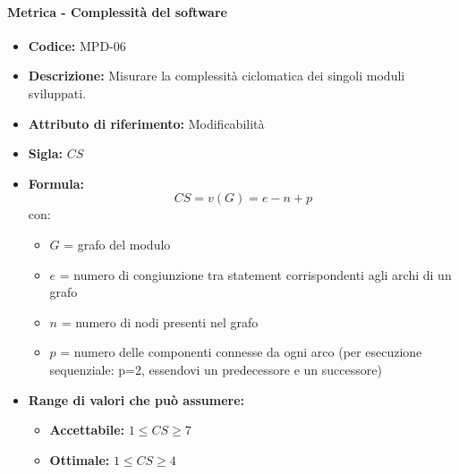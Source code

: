            \paragraph{Metrica - Complessità del software} 
              \begin{itemize}
         \item   \textbf{Codice:} MPD-06
         \item   \textbf{Descrizione:} Misurare la complessità ciclomatica dei singoli moduli sviluppati.
          \item  \textbf{Attributo di riferimento:} Modificabilità
          \item  \textbf{Sigla:} $CS$
         \item   \textbf{Formula:} $$CS = v(G) = e - n + p $$
         con:
         \begin{itemize}
            \item $G$ = grafo del modulo
            \item $e$ = numero di congiunzione tra statement corrispondenti agli archi di un grafo
            \item $n$ = numero di nodi presenti nel grafo
            \item $p$ = numero delle componenti connesse da ogni arco (per esecuzione sequenziale: p=2, essendovi un predecessore e un successore)
         \end{itemize}
           
        \item \textbf{Range di valori che può assumere:}
        \begin{itemize}
            \item \textbf{Accettabile:} $1\leq CS \geq7 $
            \item \textbf{Ottimale:} $ 1\leq CS \geq4 $
        \end{itemize}
       \end{itemize}
              

